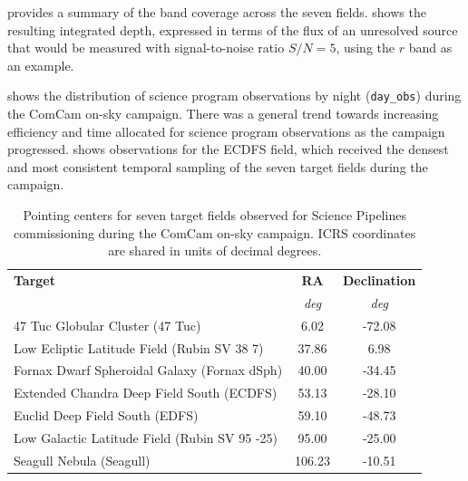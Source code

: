  provides a summary of the band coverage across the seven fields.
 shows the resulting integrated depth, expressed in terms of the flux of an unresolved source that would be measured with signal-to-noise ratio $S/N = 5$, using the $r$ band as an example.

 shows the distribution of science program observations by night (\texttt{day\_obs}) during the ComCam on-sky campaign.
There was a general trend towards increasing efficiency and time allocated for science program observations as the campaign progressed.
 shows observations for the ECDFS field, which received the densest and most consistent temporal sampling of the seven target fields during the campaign.









\begin{table}
    \centering
    \begin{tabular}{@{}lcc@{}}
    \textbf{Target} & \textbf{RA} & \textbf{Declination} \\
     & \textit{deg} & \textit{deg} \\
    \hline
    47 Tuc Globular Cluster (47 Tuc)              & 6.02    & -72.08    \\
    Low Ecliptic Latitude Field (Rubin SV 38 7)   & 37.86   & 6.98      \\
    Fornax Dwarf Spheroidal Galaxy (Fornax dSph)  & 40.00   & -34.45    \\
    Extended Chandra Deep Field South (ECDFS)     & 53.13   & -28.10    \\
    Euclid Deep Field South (EDFS)                & 59.10   & -48.73    \\
    Low Galactic Latitude Field (Rubin SV 95 -25) & 95.00   & -25.00    \\
    Seagull Nebula (Seagull)                      & 106.23  & -10.51    \\
    \end{tabular}
    \caption{Pointing centers for seven target fields observed for Science Pipelines commissioning during the ComCam on-sky campaign. ICRS coordinates are shared in units of decimal degrees.}
    \label{tab:target_fields_pointing_centers}
\end{table}


